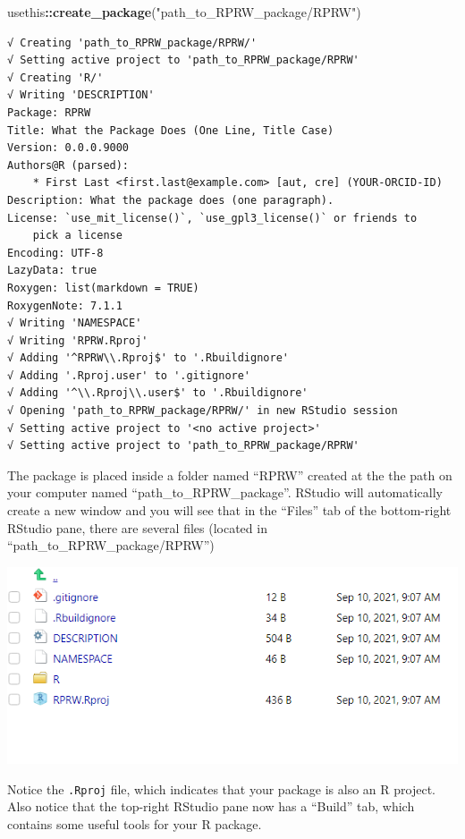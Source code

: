 \documentclass[
]{book}
\newenvironment{Shaded}{\begin{snugshade}}{\end{snugshade}}
\newcommand{\KeywordTok}[1]{\textcolor[rgb]{0.13,0.29,0.53}{\textbf{#1}}}
\newcommand{\NormalTok}[1]{#1}
\newcommand{\OperatorTok}[1]{\textcolor[rgb]{0.81,0.36,0.00}{\textbf{#1}}}
\newcommand{\StringTok}[1]{\textcolor[rgb]{0.31,0.60,0.02}{#1}}
\begin{document}
\begin{Shaded}
\begin{Highlighting}[]
\NormalTok{usethis}\OperatorTok{::}\KeywordTok{create_package}\NormalTok{(}\StringTok{"path_to_RPRW_package/RPRW"}\NormalTok{)}
\end{Highlighting}
\end{Shaded}

\begin{verbatim}
√ Creating 'path_to_RPRW_package/RPRW/'
√ Setting active project to 'path_to_RPRW_package/RPRW'
√ Creating 'R/'
√ Writing 'DESCRIPTION'
Package: RPRW
Title: What the Package Does (One Line, Title Case)
Version: 0.0.0.9000
Authors@R (parsed):
    * First Last <first.last@example.com> [aut, cre] (YOUR-ORCID-ID)
Description: What the package does (one paragraph).
License: `use_mit_license()`, `use_gpl3_license()` or friends to
    pick a license
Encoding: UTF-8
LazyData: true
Roxygen: list(markdown = TRUE)
RoxygenNote: 7.1.1
√ Writing 'NAMESPACE'
√ Writing 'RPRW.Rproj'
√ Adding '^RPRW\\.Rproj$' to '.Rbuildignore'
√ Adding '.Rproj.user' to '.gitignore'
√ Adding '^\\.Rproj\\.user$' to '.Rbuildignore'
√ Opening 'path_to_RPRW_package/RPRW/' in new RStudio session
√ Setting active project to '<no active project>'
√ Setting active project to 'path_to_RPRW_package/RPRW'
\end{verbatim}

The package is placed inside a folder named ``RPRW'' created at the the path on your computer named ``path\_to\_RPRW\_package''. RStudio will automatically create a new window and you will see that in the ``Files'' tab of the bottom-right RStudio pane, there are several files (located in ``path\_to\_RPRW\_package/RPRW'')

\includegraphics[width=1\linewidth]{images/newrpack_files}

Notice the \texttt{.Rproj} file, which indicates that your package is also an R project. Also notice that the top-right RStudio pane now has a ``Build'' tab, which contains some useful tools for your R package.
\end{document}
